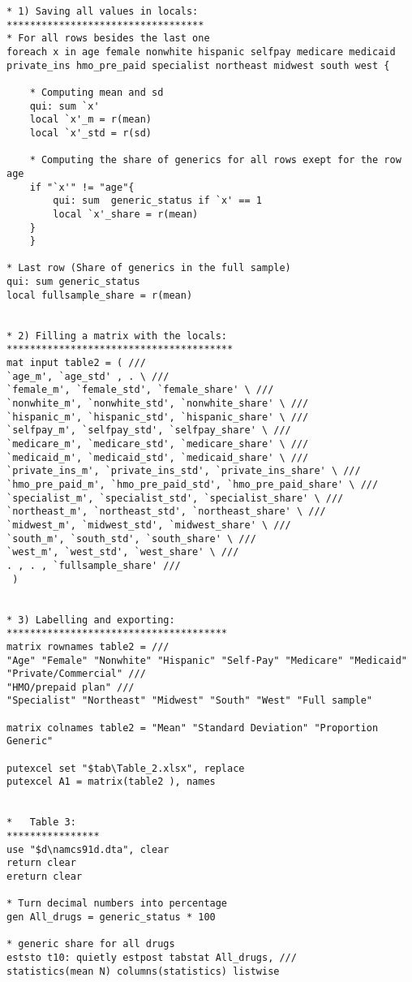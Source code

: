 \documentclass[
]{book}
\begin{document}
\begin{verbatim}
* 1) Saving all values in locals:
**********************************
* For all rows besides the last one
foreach x in age female nonwhite hispanic selfpay medicare medicaid  private_ins hmo_pre_paid specialist northeast midwest south west {
    
    * Computing mean and sd
    qui: sum `x'
    local `x'_m = r(mean)
    local `x'_std = r(sd)
    
    * Computing the share of generics for all rows exept for the row age
    if "`x'" != "age"{
        qui: sum  generic_status if `x' == 1
        local `x'_share = r(mean)
    }
    }
    
* Last row (Share of generics in the full sample)
qui: sum generic_status
local fullsample_share = r(mean)
    

* 2) Filling a matrix with the locals:
***************************************
mat input table2 = ( /// 
`age_m', `age_std' , . \ ///
`female_m', `female_std', `female_share' \ ///
`nonwhite_m', `nonwhite_std', `nonwhite_share' \ ///
`hispanic_m', `hispanic_std', `hispanic_share' \ ///
`selfpay_m', `selfpay_std', `selfpay_share' \ ///
`medicare_m', `medicare_std', `medicare_share' \ ///
`medicaid_m', `medicaid_std', `medicaid_share' \ ///
`private_ins_m', `private_ins_std', `private_ins_share' \ ///
`hmo_pre_paid_m', `hmo_pre_paid_std', `hmo_pre_paid_share' \ ///
`specialist_m', `specialist_std', `specialist_share' \ ///
`northeast_m', `northeast_std', `northeast_share' \ ///
`midwest_m', `midwest_std', `midwest_share' \ ///
`south_m', `south_std', `south_share' \ ///
`west_m', `west_std', `west_share' \ ///
. , . , `fullsample_share' ///
 )

 
* 3) Labelling and exporting:
**************************************
matrix rownames table2 = ///
"Age" "Female" "Nonwhite" "Hispanic" "Self-Pay" "Medicare" "Medicaid" "Private/Commercial" ///
"HMO/prepaid plan" ///
"Specialist" "Northeast" "Midwest" "South" "West" "Full sample"

matrix colnames table2 = "Mean" "Standard Deviation" "Proportion Generic"

putexcel set "$tab\Table_2.xlsx", replace
putexcel A1 = matrix(table2 ), names


*   Table 3:
****************
use "$d\namcs91d.dta", clear
return clear
ereturn clear

* Turn decimal numbers into percentage
gen All_drugs = generic_status * 100

* generic share for all drugs
eststo t10: quietly estpost tabstat All_drugs, ///
statistics(mean N) columns(statistics) listwise


\end{verbatim}
\end{document}
